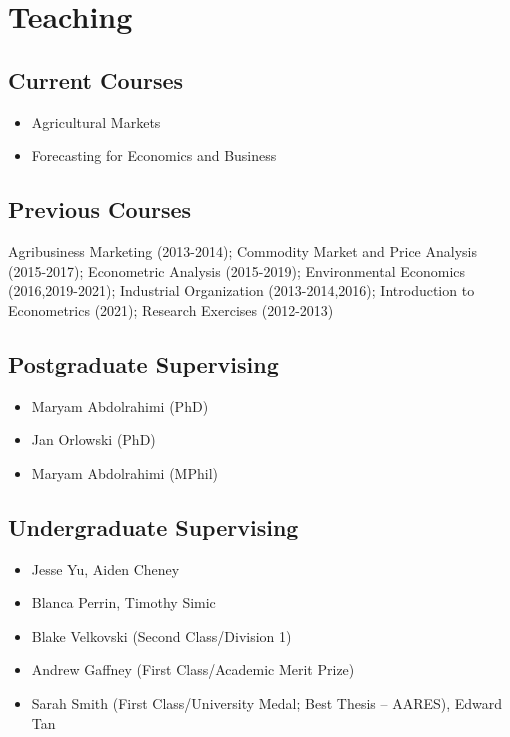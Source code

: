 \documentclass[10pt]{article}
\begin{document}
	\bigskip
	
	\section*{Teaching}
	
	\subsection*{Current Courses}
	\begin{itemize}
		\item {} Agricultural Markets
		\item {} Forecasting for Economics and Business
	\end{itemize}
	
	\subsection*{Previous Courses}	
	Agribusiness Marketing (2013-2014); Commodity Market and Price Analysis (2015-2017); Econometric Analysis (2015-2019); Environmental Economics (2016,2019-2021); Industrial Organization (2013-2014,2016); Introduction to Econometrics (2021); Research Exercises (2012-2013)
	
	\subsection*{Postgraduate Supervising}	
	\begin{itemize}
		\item {} Maryam Abdolrahimi (PhD)
		\item {} Jan Orlowski (PhD)
		\item {} Maryam Abdolrahimi (MPhil)
	\end{itemize}

	\subsection*{Undergraduate Supervising}	
	\begin{itemize}
		\item {} Jesse Yu, Aiden Cheney
		\item {} Blanca Perrin, Timothy Simic
		\item {} Blake Velkovski (Second Class/Division 1)
		\item {} Andrew Gaffney (First Class/Academic Merit Prize)
		\item {} Sarah Smith (First Class/University Medal; Best Thesis -- AARES), Edward Tan
	\end{itemize}
	
\end{document}

